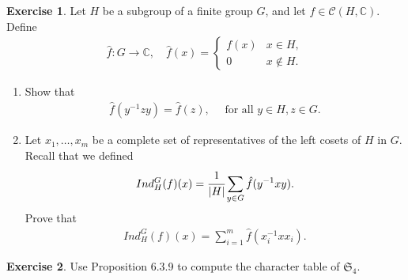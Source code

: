 \documentclass[12pt]{extarticle}
\newcommand{\abs}[1]{|#1|}
\newcommand{\C}{\mathbb{C}}
\newcommand{\<}{\langle}
\renewcommand{\>}{\rangle}
\theoremstyle{definition}
\newtheorem{exercise}{Exercise}
\begin{document}
\begin{exercise}
  Let $H$ be a subgroup of a finite group $G$, and let $f \in \mathcal{C}(H,\C)$. Define
  \begin{align*}
    \hat f : G \to \C, \quad \hat f (x) = 
    \begin{cases}
      f(x) & x \in H, \\
      0 & x \not \in H. 
    \end{cases}
  \end{align*}
  \begin{enumerate}
  \item
    Show that
    \begin{align*}
      \hat f (y^{-1} z y) = \hat f (z), \quad \text{ for all } y \in H, z \in G. 
    \end{align*}
  \item
    Let $x_1, \dots, x_m$ be a complete set of representatives of the left cosets of $H$ in $G$. Recall that we defined
    \begin{align*}
      Ind_H^G(f)(x) = \cfrac{1}{\abs{H}} \sum\limits_{y \in G} \hat f (y^{-1}xy).
    \end{align*}
    Prove that
    \begin{align*}
      Ind_H^G(f)(x) = \sum\limits_{i=1}^m \hat f (x_i^{-1}xx_i).      
    \end{align*}
  \end{enumerate}
\end{exercise}

\begin{exercise}
  Use Proposition 6.3.9 to compute the character table of $\mathfrak{S}_4$.
\end{exercise}
\end{document}
